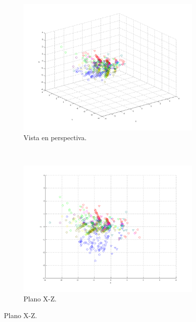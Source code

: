 \documentclass[informe.tex]{subfiles}
\begin{document}
      
	\begin{figure}[H]
        \centering
        \hspace*{-6.5cm}
        \begin{subfigure}[b]{0.49\textwidth}
                \includegraphics[width=\textwidth]{graficos/fold1_criterioParadap_reglas_alpha0_rep5_0P.png}
                \caption{Vista en perspectiva.}
        \end{subfigure}%
        ~
        \begin{subfigure}[b]{0.49\textwidth}
                \includegraphics[width=\textwidth]{graficos/fold1_criterioParadap_reglas_alpha0_rep5_1XZ.png}
                \caption{Plano X-Z.}
        \end{subfigure}
        

\end{figure}
\end{document}
